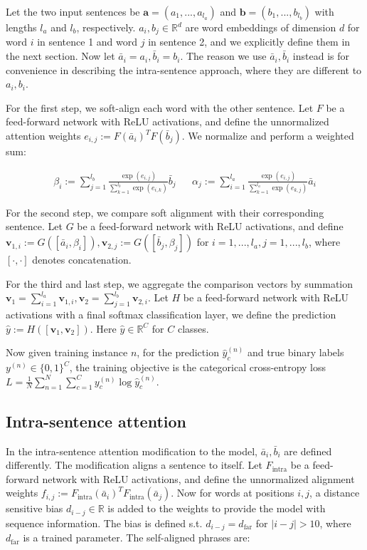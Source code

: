 \documentclass{article}
\begin{document}
Let the two input sentences be $\textbf{a}=(a_1,...,a_{l_a})$ and $\textbf{b}=(b_1,...,b_{l_b})$ with lengths $l_a$ and $l_b$, respectively. $a_i, b_j\in\mathbb{R}^d$ are word embeddings of dimension $d$ for word $i$ in sentence 1 and word $j$ in sentence 2, and we explicitly define them in the next section. Now let $\bar{a}_i = a_i, \bar{b}_i = b_i$. The reason we use $\bar{a}_i, \bar{b}_i$ instead is for convenience in describing the intra-sentence approach, where they are different to $a_i, b_i$.

For the first step, we soft-align each word with the other sentence. Let $F$ be a feed-forward network with ReLU activations, and define the unnormalized attention weights $e_{i,j} := F(\bar{a}_i)^T F(\bar{b}_j)$. We normalize and perform a weighted sum:

\begin{align*}
    \beta_i := \sum_{j=1}^{l_b} \frac{\exp(e_{i,j})}{\sum_{k=1}^{l_b}\exp(e_{i,k})} \bar{b}_j &&
    \alpha_j := \sum_{i=1}^{l_a} \frac{\exp(e_{i,j})}{\sum_{k=1}^{l_a}\exp(e_{k,j})} \bar{a}_i
\end{align*}

For the second step, we compare soft alignment with their corresponding sentence. Let $G$ be a feed-forward network with ReLU activations, and define $\mathbf{v}_{1,i} := G([\bar{a}_i, \beta_i]), \mathbf{v}_{2,j} := G([\bar{b}_j, \beta_j])$ for $i=1,...,l_a, j=1,...,l_b$, where $[\cdot, \cdot]$ denotes concatenation.

For the third and last step, we aggregate the comparison vectors by summation $\mathbf{v}_1 = \sum_{i=1}^{l_a}\mathbf{v}_{1,i}, \mathbf{v}_2 = \sum_{j=1}^{l_b}\mathbf{v}_{2,i}$. Let $H$ be a feed-forward network with ReLU activations with a final softmax classification layer, we define the prediction $\hat{y} := H([\mathbf{v}_1, \mathbf{v}_2])$. Here $\hat{y}\in\mathbb{R}^C$ for $C$ classes.

Now given training instance $n$, for the prediction $\hat{y}_c^{(n)}$ and true binary labels $y^{(n)}\in\{0, 1\}^C$, the training objective is the categorical cross-entropy loss $L = \frac{1}{N} \sum_{n=1}^N \sum_{c=1}^C y_c^{(n)} \log \hat{y}_c^{(n)}$.

\subsection{Intra-sentence attention}
In the intra-sentence attention modification to the model, $\bar{a}_i, \bar{b}_i$ are defined differently. The modification aligns a sentence to itself. Let $F_\text{intra}$ be a feed-forward network with ReLU activations, and define the unnormalized alignment weights $f_{i,j} := F_\text{intra}(\bar{a}_i)^T F_\text{intra}(\bar{a}_j)$. Now for words at positions $i, j$, a distance sensitive bias $d_{i-j}\in\mathbb{R}$ is added to the weights to provide the model with sequence information. The bias is defined s.t. $d_{i-j} = d_\text{far}$ for $|i-j| > 10$, where $d_\text{far}$ is a trained parameter. The self-aligned phrases are:
\end{document}
